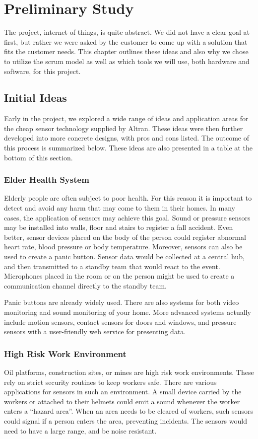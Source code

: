 \documentclass[../document]{subfiles}
\begin{document}
\section{Preliminary Study}
\label{sec:preliminary_study}
The project, internet of things, is quite abstract. We did not have a clear goal at first, but rather we were asked by the customer to come up with a solution that fits the customer needs. This chapter outlines these ideas and also why we chose to utilize the scrum model as well as which tools we will use, both hardware and software, for this project.

\subsection{Initial Ideas}
\label{subsec:initial_ideas}
Early in the project, we explored a wide range of ideas and application areas for the cheap sensor technology supplied by Altran. These ideas were then further developed into more concrete designs, with pros and cons listed. The outcome of this process is summarized below. These ideas are also presented in a table at the bottom of this section.

\subsubsection{Elder Health System}
Elderly people are often subject to poor health. For this reason it is important to detect and avoid any harm that may come to them in their homes. In many cases, the application of sensors may achieve this goal. Sound or pressure sensors may be installed into walls, floor and stairs to register a fall accident. Even better, sensor devices placed on the body of the person could register abnormal heart rate, blood pressure or body temperature. Moreover, sensors can also be used to create a panic button. Sensor data would be collected at a central hub, and then transmitted to a standby team that would react to the event. Microphones placed in the room or on the person might be used to create a communication channel directly to the standby team.

Panic buttons are already widely used. There are also systems for both video monitoring and sound monitoring of your home. More advanced systems actually include motion sensors, contact sensors for doors and windows, and pressure sensors with a user-friendly web service for presenting data.

\subsubsection{High Risk Work Environment}
Oil platforms, construction sites, or mines are high risk work environments. These rely on strict security routines to keep workers safe. There are various applications for sensors in such an environment. A small device carried by the workers or attached to their helmets could emit a sound whenever the worker enters a “hazard area”. When an area needs to be cleared of workers, such sensors could signal if a person enters the area, preventing incidents. The sensors would need to have a large range, and be noise resistant.
\end{document}
